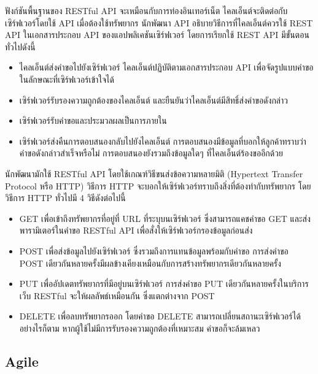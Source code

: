 \documentclass[12pt,oneside,openright,a4paper]{cpe-thai-project}
\begin{document}
    \hspace{1cm}ฟังก์ชันพื้นฐานของ RESTful API จะเหมือนกับการท่องอินเทอร์เน็ต ไคลเอ็นต์จะติดต่อกับเซิร์ฟเวอร์โดยใช้ API 
    เมื่อต้องใช้ทรัพยากร นักพัฒนา API อธิบายวิธีการที่ไคลเอ็นต์ควรใช้ REST API ในเอกสารประกอบ API ของแอปพลิเคชันเซิร์ฟเวอร์ 
    โดยการเรียกใช้ REST API มีขั้นตอนทั่วไปดังนี้
    \begin{itemize}
      \item ไคลเอ็นต์ส่งคำขอไปยังเซิร์ฟเวอร์ ไคลเอ็นต์ปฏิบัติตามเอกสารประกอบ API เพื่อจัดรูปแบบคำขอในลักษณะที่เซิร์ฟเวอร์เข้าใจได้
      \item เซิร์ฟเวอร์รับรองความถูกต้องของไคลเอ็นต์ และยืนยันว่าไคลเอ็นต์มีสิทธิ์ส่งคำขอดังกล่าว
      \item เซิร์ฟเวอร์รับคำขอและประมวลผลเป็นการภายใน
      \item เซิร์ฟเวอร์ส่งคืนการตอบสนองกลับไปยังไคลเอ็นต์ การตอบสนองมีข้อมูลที่บอกให้ลูกค้าทราบว่าคำขอดังกล่าวสำเร็จหรือไม่ การตอบสนองยังรวมถึงข้อมูลใดๆ ที่ไคลเอ็นต์ร้องขออีกด้วย
    \end{itemize}
    \hspace{1cm}นักพัฒนามักใช้ RESTful API โดยใช้เกณฑ์วิธีขนส่งข้อความหลายมิติ (Hypertext Transfer Protocol หรือ HTTP) 
    วิธีการ HTTP จะบอกให้เซิร์ฟเวอร์ทราบถึงสิ่งที่ต้องทำกับทรัพยากร โดยวิธีการ HTTP ทั่วไปมี 4 วิธีดังต่อไปนี้
    \begin{itemize}
      \item GET
            \newline เพื่อเข้าถึงทรัพยากรที่อยู่ที่ URL ที่ระบุบนเซิร์ฟเวอร์ ซึ่งสามารถแคชคำขอ GET และส่งพารามิเตอร์ในคำขอ RESTful API เพื่อสั่งให้เซิร์ฟเวอร์กรองข้อมูลก่อนส่ง
      \item POST
            \newline เพื่อส่งข้อมูลไปยังเซิร์ฟเวอร์ ซึ่งรวมถึงการแทนข้อมูลพร้อมกับคำขอ การส่งคำขอ POST เดียวกันหลายครั้งมีผลข้างเคียงเหมือนกับการสร้างทรัพยากรเดียวกันหลายครั้ง
      \item PUT
            \newline เพื่ออัปเดตทรัพยากรที่มีอยู่บนเซิร์ฟเวอร์ การส่งคำขอ PUT เดียวกันหลายครั้งในบริการเว็บ RESTful จะให้ผลลัพธ์เหมือนกัน ซึ่งแตกต่างจาก POST
      \item DELETE
            \newline เพื่อลบทรัพยากรออก โดยคำขอ DELETE สามารถเปลี่ยนสถานะเซิร์ฟเวอร์ได้ อย่างไรก็ตาม หากผู้ใช้ไม่มีการรับรองความถูกต้องที่เหมาะสม คำขอก็จะล้มเหลว
    \end{itemize}

  \subsection{Agile}
\end{document}
